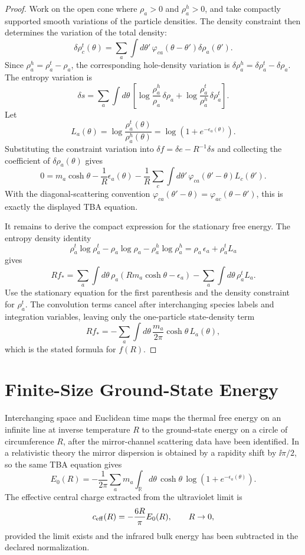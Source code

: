 \begin{proof}
Work on the open cone where \(\rho_a>0\) and \(\rho_a^h>0\), and take compactly
supported smooth variations of the particle densities.  The density
constraint then determines the variation of the total density:
\[
  \delta\rho_c^t(\theta)
  =
  \sum_a\int d\theta'\,
  \varphi_{ca}(\theta-\theta')\delta\rho_a(\theta').
\]
Since \(\rho_a^h=\rho_a^t-\rho_a\), the corresponding hole-density variation
is \(\delta\rho_a^h=\delta\rho_a^t-\delta\rho_a\).
The entropy variation is
\[
  \delta s
  =
  \sum_a\int d\theta\,
  \left[
  \log\frac{\rho_a^h}{\rho_a}\,\delta\rho_a
  +
  \log\frac{\rho_a^t}{\rho_a^h}\,\delta\rho_a^t
  \right].
\]
Let
\[
  L_a(\theta)=\log\frac{\rho_a^t(\theta)}{\rho_a^h(\theta)}
  =
  \log(1+e^{-\epsilon_a(\theta)}).
\]
Substituting the constraint variation into \(\delta f=\delta e-R^{-1}\delta s\)
and collecting the coefficient of \(\delta\rho_a(\theta)\) gives
\[
  0
  =
  m_a\cosh\theta
  -\frac1R\epsilon_a(\theta)
  -\frac1R
  \sum_c\int d\theta'\,
  \varphi_{ca}(\theta'-\theta)L_c(\theta').
\]
With the diagonal-scattering convention
\(\varphi_{ca}(\theta'-\theta)=\varphi_{ac}(\theta-\theta')\), this is exactly
the displayed TBA equation.

It remains to derive the compact expression for the stationary free energy.
The entropy density identity
\[
  \rho_a^t\log\rho_a^t-\rho_a\log\rho_a-\rho_a^h\log\rho_a^h
  =
  \rho_a\,\epsilon_a+\rho_a^t L_a
\]
gives
\[
  Rf_\ast
  =
  \sum_a\int d\theta\,
  \rho_a(Rm_a\cosh\theta-\epsilon_a)
  -
  \sum_a\int d\theta\,\rho_a^t L_a .
\]
Use the stationary equation for the first parenthesis and the density
constraint for \(\rho_a^t\).  The convolution terms cancel after interchanging
species labels and integration variables, leaving only the one-particle
state-density term
\[
  Rf_\ast
  =
  -\sum_a\int d\theta\,
  \frac{m_a}{2\pi}\cosh\theta\,L_a(\theta),
\]
which is the stated formula for \(f(R)\).
\end{proof}

\section{Finite-Size Ground-State Energy}
\label{sec:tba-finite-size-ground-state}

Interchanging space and Euclidean time maps the thermal free energy on an
infinite line at inverse temperature \(R\) to the ground-state energy on a
circle of circumference \(R\), after the mirror-channel scattering data have
been identified.  In a relativistic theory the mirror dispersion is obtained
by a rapidity shift by \(\ii\pi/2\), so the same TBA equation gives
\[
  E_0(R)
  =
  -\frac{1}{2\pi}
  \sum_a m_a\int_{\mathbb R}d\theta\,
  \cosh\theta\,
  \log\!\left(1+e^{-\epsilon_a(\theta)}\right).
\]
The effective central charge extracted from the ultraviolet limit is
\[
  c_{\rm eff}(R)
  =
  -\frac{6R}{\pi}E_0(R),
  \qquad R\to0,
\]
provided the limit exists and the infrared bulk energy has been subtracted in
the declared normalization.

